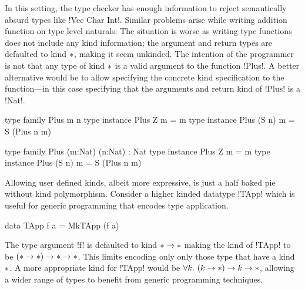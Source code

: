 \documentclass[manuscript,screen,nonacm]{acmart}
\begin{document}
In this setting, the type checker has enough information to reject semantically absurd types like !Vec Char Int!.
Similar problems arise while writing addition function on type level naturals. The situation is worse as writing type functions does not include any kind information; the argument and return types are defaulted to kind $\ast$, making it seem unkinded. The intention of the programmer is not that any type of kind $\ast$ is a valid argument to the function !Plus!. A better alternative would be to allow specifying the concrete kind specification to the function---in this case specifying that the arguments and return kind of !Plus! is a !Nat!.

\begin{minipage}[ht]{0.4\linewidth}
  \begin{code}
    type family Plus m n
    type instance Plus Z m     = m
    type instance Plus (S n) m = S (Plus n m)
  \end{code}
\end{minipage}
\begin{minipage}[ht]{0.4\linewidth}
  \begin{code}
    type family Plus (m:Nat) (n:Nat) : Nat
    type instance Plus Z m     = m
    type instance Plus (S n) m = S (Plus n m)
  \end{code}
\end{minipage}

Allowing user defined kinds, albeit more expressive, is just a half baked pie without kind polymorphism. Consider a higher kinded datatype !TApp! which is useful for generic programming that encodes type application.
\begin{code}
  data TApp f a = MkTApp (f a)
\end{code}

The type argument !f! is defaulted to kind $\ast \to \ast$ making the kind of !TApp! to be $(\ast \to \ast) \to \ast \to \ast$. This limits encoding only only those type that have a kind $\ast$. A more appropriate kind for !TApp! would be $\forall k.~(k\to\ast) \to k \to \ast$, allowing a wider range of types to benefit from generic programming techniques.
\end{document}
